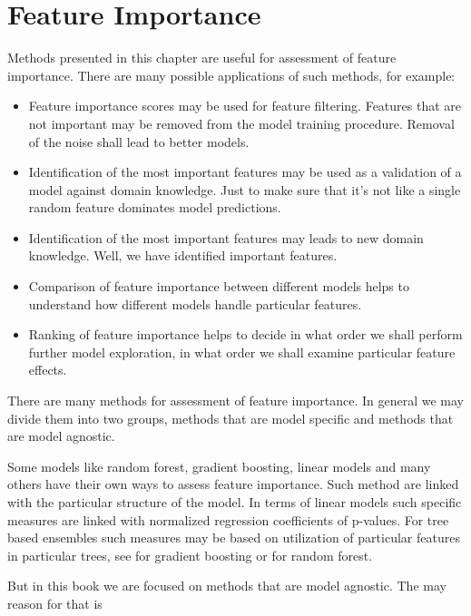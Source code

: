 \documentclass[]{krantz}
\providecommand{\tightlist}{%
  \setlength{\itemsep}{0pt}\setlength{\parskip}{0pt}}
\theoremstyle{definition}
\theoremstyle{definition}
\theoremstyle{definition}
\theoremstyle{remark}
\begin{document}
\hypertarget{variableImportance}{%
\section{Feature Importance}\label{variableImportance}}

Methods presented in this chapter are useful for assessment of feature
importance. There are many possible applications of such methods, for
example:

\begin{itemize}
\tightlist
\item
  Feature importance scores may be used for feature filtering. Features
  that are not important may be removed from the model training
  procedure. Removal of the noise shall lead to better models.
\item
  Identification of the most important features may be used as a
  validation of a model against domain knowledge. Just to make sure that
  it's not like a single random feature dominates model predictions.
\item
  Identification of the most important features may leads to new domain
  knowledge. Well, we have identified important features.
\item
  Comparison of feature importance between different models helps to
  understand how different models handle particular features.
\item
  Ranking of feature importance helps to decide in what order we shall
  perform further model exploration, in what order we shall examine
  particular feature effects.
\end{itemize}

There are many methods for assessment of feature importance. In general
we may divide them into two groups, methods that are model specific and
methods that are model agnostic.

Some models like random forest, gradient boosting, linear models and
many others have their own ways to assess feature importance. Such
method are linked with the particular structure of the model. In terms
of linear models such specific measures are linked with normalized
regression coefficients of p-values. For tree based ensembles such
measures may be based on utilization of particular features in
particular trees, see \citep{xgboostExplainer} for gradient boosting or
\citep{randomForestExplainer} for random forest.

But in this book we are focused on methods that are model agnostic. The
may reason for that is
\end{document}
